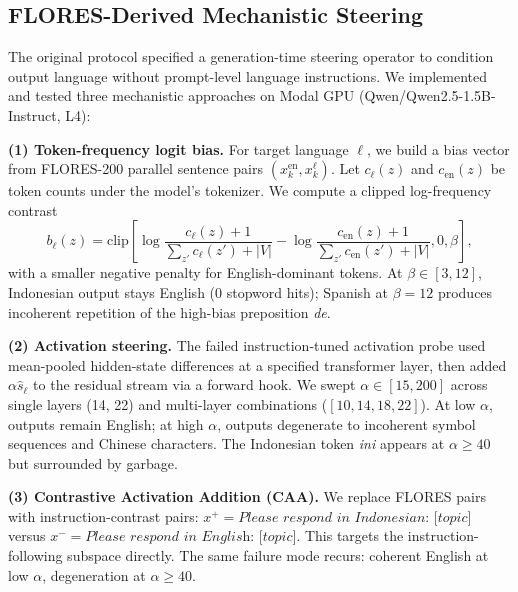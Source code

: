 \documentclass{article}
\begin{document}
\subsection{FLORES-Derived Mechanistic Steering}
\label{sec:steering}

The original protocol specified a generation-time steering operator to condition output language without prompt-level language instructions. We implemented and tested three mechanistic approaches on Modal GPU (Qwen/Qwen2.5-1.5B-Instruct, L4):

\textbf{(1) Token-frequency logit bias.} For target language $\ell$, we build a bias vector from FLORES-200 parallel sentence pairs $(x^{\mathrm{en}}_k,x^\ell_k)$. Let $c_{\ell}(z)$ and $c_{\mathrm{en}}(z)$ be token counts under the model's tokenizer. We compute a clipped log-frequency contrast
\begin{equation}
b_\ell(z)=\mathrm{clip}\left[
\log\frac{c_{\ell}(z)+1}{\sum_{z'}c_{\ell}(z')+|V|}
-
\log\frac{c_{\mathrm{en}}(z)+1}{\sum_{z'}c_{\mathrm{en}}(z')+|V|},
0,\beta
\right],
\end{equation}
with a smaller negative penalty for English-dominant tokens. At $\beta \in [3,12]$, Indonesian output stays English (0 stopword hits); Spanish at $\beta=12$ produces incoherent repetition of the high-bias preposition \textit{de}.

\textbf{(2) Activation steering.} The failed instruction-tuned activation probe used mean-pooled hidden-state differences at a specified transformer layer, then added $\alpha \hat{s}_\ell$ to the residual stream via a forward hook. We swept $\alpha \in [15,200]$ across single layers (14, 22) and multi-layer combinations ($[10,14,18,22]$). At low $\alpha$, outputs remain English; at high $\alpha$, outputs degenerate to incoherent symbol sequences and Chinese characters. The Indonesian token \textit{ini} appears at $\alpha \geq 40$ but surrounded by garbage.

\textbf{(3) Contrastive Activation Addition (CAA).} We replace FLORES pairs with instruction-contrast pairs: $x^+ = \textit{Please respond in Indonesian: [topic]}$ versus $x^- = \textit{Please respond in English: [topic]}$. This targets the instruction-following subspace directly. The same failure mode recurs: coherent English at low $\alpha$, degeneration at $\alpha \geq 40$.
\end{document}
